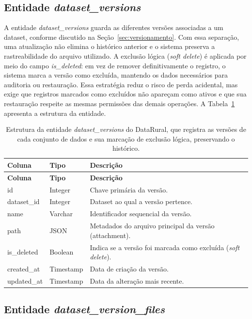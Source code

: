 \subsection{Entidade \textit{dataset\_versions}}

A entidade \textit{dataset\_versions} guarda as diferentes versões associadas a um dataset, conforme discutido na Seção~\ref{sec:versionamento}. Com essa separação, uma atualização não elimina o histórico anterior e o sistema preserva a rastreabilidade do arquivo utilizado. A exclusão lógica (\textit{soft delete}) é aplicada por meio do campo \textit{is\_deleted}: em vez de remover definitivamente o registro, o sistema marca a versão como excluída, mantendo os dados necessários para auditoria ou restauração. Essa estratégia reduz o risco de perda acidental, mas exige que registros marcados como excluídos não apareçam como ativos e que sua restauração respeite as mesmas permissões das demais operações. A Tabela~\ref{tab:entity_dataset_versions} apresenta a estrutura da entidade.

\begin{longtable}{p{}p{}p{}}
\caption{Estrutura da entidade \textit{dataset\_versions} do DataRural, que registra as versões de cada conjunto de dados e sua marcação de exclusão lógica, preservando o histórico.}\label{tab:entity_dataset_versions}\\
\toprule
\textbf{Coluna} & \textbf{Tipo} & \textbf{Descrição} \\
\midrule
\endfirsthead
\toprule
\textbf{Coluna} & \textbf{Tipo} & \textbf{Descrição} \\
\midrule
\endhead
id & Integer & Chave primária da versão. \\
dataset\_id & Integer & Dataset ao qual a versão pertence. \\
name & Varchar & Identificador sequencial da versão. \\
path & JSON & Metadados do arquivo principal da versão (attachment). \\
is\_deleted & Boolean & Indica se a versão foi marcada como excluída (\textit{soft delete}). \\
created\_at & Timestamp & Data de criação da versão. \\
updated\_at & Timestamp & Data da alteração mais recente. \\
\bottomrule
\end{longtable}

\subsection{Entidade \textit{dataset\_version\_files}}


